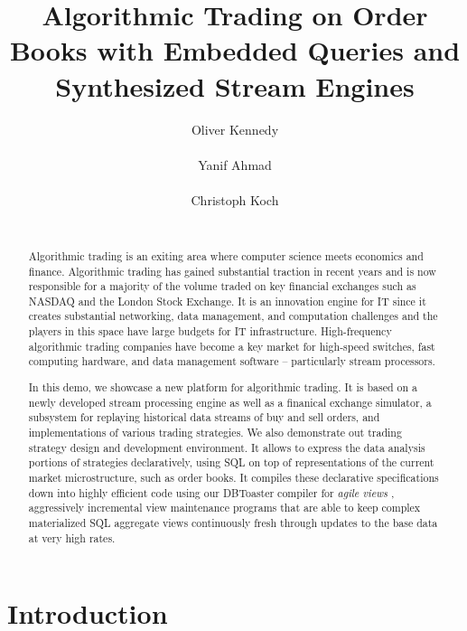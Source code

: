 \documentclass{vldb}
\begin{document}
\title{Algorithmic Trading on Order Books with Embedded Queries and Synthesized
Stream Engines}
\author{
\alignauthor
Oliver Kennedy\\
\\
\alignauthor
Yanif Ahmad\\
\\
\alignauthor
Christoph Koch\\
\\
}
\maketitle

\begin{abstract}
Algorithmic trading is an exiting area where computer science
meets economics and finance. Algorithmic
trading has gained substantial traction in recent years and is now
responsible
for a majority of the volume traded on key financial exchanges such as
NASDAQ and the London Stock Exchange.
It is an innovation engine for IT since it creates substantial
networking, data management, and computation challenges and
the players in this space have large budgets for IT infrastructure.
High-frequency algorithmic trading companies have
become a key market for high-speed switches, fast computing hardware, and data
management software -- particularly stream processors.

In this demo, we showcase a new platform for algorithmic trading.
It is based on a newly developed stream processing engine
as well as a finanical exchange simulator, a subsystem for replaying
historical data streams of buy and sell orders,
and implementations of various trading strategies.
We also demonstrate out trading strategy design and development environment.
It allows to express the data analysis portions of strategies
declaratively, using SQL on top of representations of the current
market microstructure, such as order books.
It compiles these declarative specifications down into highly efficient
code using our DBToaster compiler for {\em agile views} \cite{KAK2011},
aggressively incremental view maintenance programs that are able to
keep complex materialized SQL aggregate views continuously fresh through
updates to the base data at very high rates.
\end{abstract}

\section{Introduction}
\end{document}
